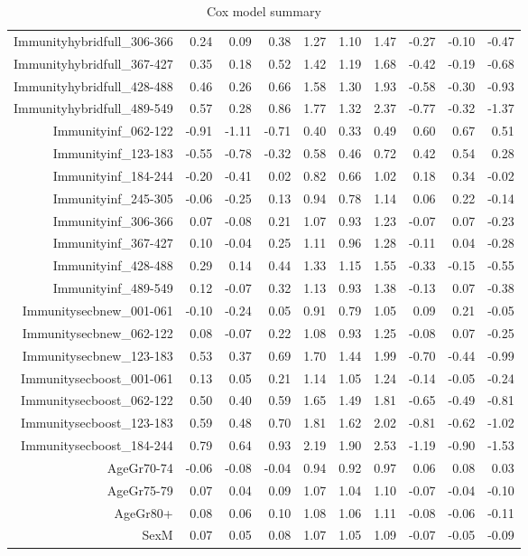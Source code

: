 \begin{table}[ht]
\begin{tabular}{rrrrrrrrrr}
  Immunityhybridfull\_306-366 & 0.24 & 0.09 & 0.38 & 1.27 & 1.10 & 1.47 & -0.27 & -0.10 & -0.47 \\ 
  Immunityhybridfull\_367-427 & 0.35 & 0.18 & 0.52 & 1.42 & 1.19 & 1.68 & -0.42 & -0.19 & -0.68 \\ 
  Immunityhybridfull\_428-488 & 0.46 & 0.26 & 0.66 & 1.58 & 1.30 & 1.93 & -0.58 & -0.30 & -0.93 \\ 
  Immunityhybridfull\_489-549 & 0.57 & 0.28 & 0.86 & 1.77 & 1.32 & 2.37 & -0.77 & -0.32 & -1.37 \\ 
  Immunityinf\_062-122 & -0.91 & -1.11 & -0.71 & 0.40 & 0.33 & 0.49 & 0.60 & 0.67 & 0.51 \\ 
  Immunityinf\_123-183 & -0.55 & -0.78 & -0.32 & 0.58 & 0.46 & 0.72 & 0.42 & 0.54 & 0.28 \\ 
  Immunityinf\_184-244 & -0.20 & -0.41 & 0.02 & 0.82 & 0.66 & 1.02 & 0.18 & 0.34 & -0.02 \\ 
  Immunityinf\_245-305 & -0.06 & -0.25 & 0.13 & 0.94 & 0.78 & 1.14 & 0.06 & 0.22 & -0.14 \\ 
  Immunityinf\_306-366 & 0.07 & -0.08 & 0.21 & 1.07 & 0.93 & 1.23 & -0.07 & 0.07 & -0.23 \\ 
  Immunityinf\_367-427 & 0.10 & -0.04 & 0.25 & 1.11 & 0.96 & 1.28 & -0.11 & 0.04 & -0.28 \\ 
  Immunityinf\_428-488 & 0.29 & 0.14 & 0.44 & 1.33 & 1.15 & 1.55 & -0.33 & -0.15 & -0.55 \\ 
  Immunityinf\_489-549 & 0.12 & -0.07 & 0.32 & 1.13 & 0.93 & 1.38 & -0.13 & 0.07 & -0.38 \\ 
  Immunitysecbnew\_001-061 & -0.10 & -0.24 & 0.05 & 0.91 & 0.79 & 1.05 & 0.09 & 0.21 & -0.05 \\ 
  Immunitysecbnew\_062-122 & 0.08 & -0.07 & 0.22 & 1.08 & 0.93 & 1.25 & -0.08 & 0.07 & -0.25 \\ 
  Immunitysecbnew\_123-183 & 0.53 & 0.37 & 0.69 & 1.70 & 1.44 & 1.99 & -0.70 & -0.44 & -0.99 \\ 
  Immunitysecboost\_001-061 & 0.13 & 0.05 & 0.21 & 1.14 & 1.05 & 1.24 & -0.14 & -0.05 & -0.24 \\ 
  Immunitysecboost\_062-122 & 0.50 & 0.40 & 0.59 & 1.65 & 1.49 & 1.81 & -0.65 & -0.49 & -0.81 \\ 
  Immunitysecboost\_123-183 & 0.59 & 0.48 & 0.70 & 1.81 & 1.62 & 2.02 & -0.81 & -0.62 & -1.02 \\ 
  Immunitysecboost\_184-244 & 0.79 & 0.64 & 0.93 & 2.19 & 1.90 & 2.53 & -1.19 & -0.90 & -1.53 \\ 
  AgeGr70-74 & -0.06 & -0.08 & -0.04 & 0.94 & 0.92 & 0.97 & 0.06 & 0.08 & 0.03 \\ 
  AgeGr75-79 & 0.07 & 0.04 & 0.09 & 1.07 & 1.04 & 1.10 & -0.07 & -0.04 & -0.10 \\ 
  AgeGr80+ & 0.08 & 0.06 & 0.10 & 1.08 & 1.06 & 1.11 & -0.08 & -0.06 & -0.11 \\ 
  SexM & 0.07 & 0.05 & 0.08 & 1.07 & 1.05 & 1.09 & -0.07 & -0.05 & -0.09 \\ 
   \hline
\end{tabular}
\caption{Cox model summary} 
\end{table}
